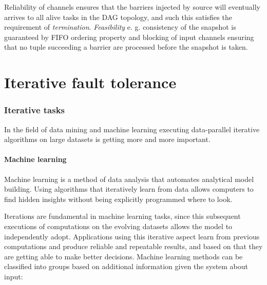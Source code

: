 Reliability of channels ensures that the barriers injected by source will eventually arrives to all alive tasks in the DAG topology, and such this  satisfies the requirement of \textit{termination}. \textit{Feasibility} e. g. consistency of the snapshot is guaranteed by FIFO ordering property and blocking of input channels ensuring that no tuple succeeding a barrier are processed before the snapshot is taken. 



\section{Iterative fault tolerance }
\subsubsection{Iterative tasks}
In the field of data mining and machine learning executing data-parallel iterative algorithms on large datasets is getting more and more important.
\paragraph{Machine learning}
\begin{displayquote}
Machine learning\cite{ml}%
is a method of data analysis that automates analytical model building. Using algorithms that iteratively learn from data allows computers to find hidden insights without being explicitly programmed where to look.
\end{displayquote}
Iterations are fundamental in machine learning tasks, since this subsequent executions of computations on the evolving datasets allows the model to independently adopt. Applications using this iterative aspect learn from previous computations and produce reliable and repeatable results, and based on that they are getting able to make better decisions.
Machine learning methods\cite{ml}%
 can be classified into groups based on additional information given the system about input:
 
